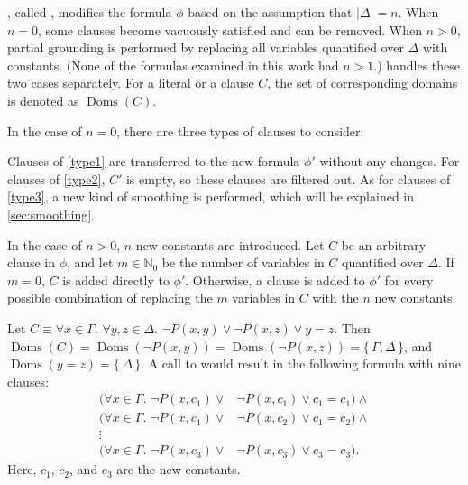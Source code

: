 \documentclass[a4paper,UKenglish,cleveref, autoref, thm-restate]{lipics-v2021}
\DeclareMathOperator{\Doms}{Doms}
\begin{document}
, called \Propagate, modifies the formula $\phi$ based on
the assumption that $|\Delta| = n$. When $n=0$, some clauses become vacuously
satisfied and can be removed. When $n > 0$, partial grounding is performed by
replacing all variables quantified over $\Delta$ with constants. (None of the
formulas examined in this work had $n > 1$.)  handles these
two cases separately. For a literal or a clause $C$, the set of corresponding
domains is denoted as $\Doms(C)$.

In the case of $n = 0$, there are three types of clauses to consider:
Clauses of \cref{type1} are transferred to the new formula $\phi'$ without any
changes. For clauses of \cref{type2}, $C'$ is empty, so these clauses are
filtered out. As for clauses of \cref{type3}, a new kind of smoothing is
performed, which will be explained in \cref{sec:smoothing}.

In the case of $n>0$, $n$ new constants are introduced. Let $C$ be an arbitrary
clause in $\phi$, and let $m \in \mathbb{N}_{0}$ be the number of variables in
$C$ quantified over $\Delta$. If $m=0$, $C$ is added directly to $\phi'$.
Otherwise, a clause is added to $\phi'$ for every possible combination of
replacing the $m$ variables in $C$ with the $n$ new constants.

\begin{example}
  Let $C \equiv \forall x \in \Gamma\text{. }\forall y, z \in \Delta\text{.
  } \neg P(x, y) \lor \neg P(x, z) \lor y=z$. Then
  $\Doms(C) = \Doms(\neg P(x, y)) = \Doms(\neg P(x, z)) = \{\, \Gamma, \Delta \,\}$,
  and $\Doms(y=z) = \{\, \Delta \,\}$. A call to  would result in the following formula with nine clauses:
  \begin{align*}
    (\forall x \in \Gamma\text{. }\neg P(x, c_{1}) \lor& \neg P(x, c_{1}) \lor c_{1}=c_{1})\land{}\\
    (\forall x \in \Gamma\text{. }\neg P(x, c_{1}) \lor& \neg P(x, c_{2}) \lor c_{1}=c_{2})\land{}\\
    \vdots&\\
    (\forall x \in \Gamma\text{. }\neg P(x, c_{3}) \lor& \neg P(x, c_{3}) \lor c_{3}=c_{3}).
  \end{align*}
  Here, $c_{1}$, $c_{2}$, and $c_{3}$ are the new constants.
\end{example}
\end{document}
